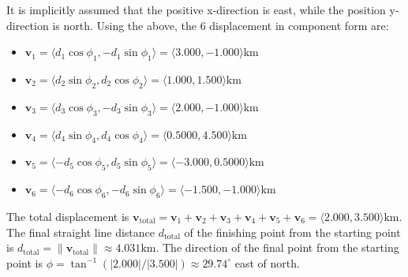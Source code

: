 \documentclass{article}
\begin{document}
It is implicitly assumed that the positive x-direction is east, while the position y-direction is north. Using the above, the 6 displacement in component form are:
\begin{itemize}
\item \(\mathbf{v}_1 = \langle d_1\cos\phi_1 , -d_1\sin\phi_1 \rangle = \langle 3.000 , -1.000 \rangle\text{km}\)
\item \(\mathbf{v}_2 = \langle d_2\sin\phi_2 , d_2\cos\phi_2 \rangle = \langle 1.000 , 1.500 \rangle\text{km}\)
\item \(\mathbf{v}_3 = \langle d_3\cos\phi_3 , -d_3\sin\phi_3 \rangle = \langle 2.000 , -1.000 \rangle\text{km}\)
\item \(\mathbf{v}_4 = \langle d_4\sin\phi_4 , d_4\cos\phi_4 \rangle = \langle 0.5000 , 4.500 \rangle\text{km}\)
\item \(\mathbf{v}_5 = \langle -d_5\cos\phi_5 , d_5\sin\phi_5 \rangle = \langle -3.000 , 0.5000 \rangle\text{km}\)
\item \(\mathbf{v}_6 = \langle -d_6\cos\phi_6 , -d_6\sin\phi_6 \rangle = \langle -1.500 , -1.000 \rangle\text{km}\)
\end{itemize}
The total displacement is \(\mathbf{v}_\text{total} = \mathbf{v}_1 + \mathbf{v}_2 + \mathbf{v}_3 + \mathbf{v}_4 + \mathbf{v}_5 + \mathbf{v}_6 = \langle 2.000 , 3.500 \rangle\text{km}\). The final straight line distance \(d_\text{total}\) of the finishing point from the starting point is \(d_\text{total} = \|\mathbf{v}_\text{total}\| \approx 4.031\text{km}\). The direction of the final point from the starting point is \(\phi = \tan^{-1}(|2.000|/|3.500|) \approx 29.74^\circ\) east of north.
\end{document}
